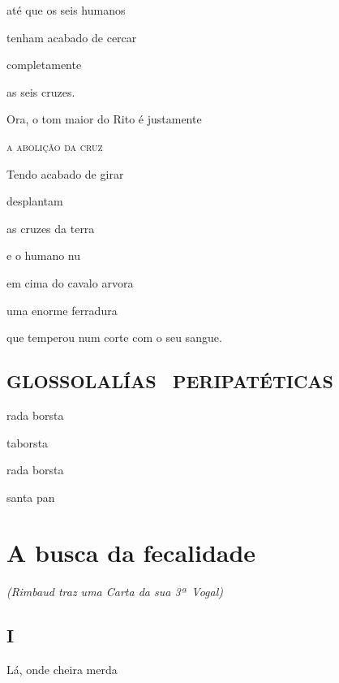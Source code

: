 até que os seis humanos

tenham acabado de cercar

completamente

as seis cruzes.


Ora, o tom maior do Rito é justamente

\textsc{a abolição da cruz}

Tendo acabado de girar

desplantam

as cruzes da terra

e o humano nu

em cima do cavalo arvora

uma enorme ferradura

que temperou num corte com o seu sangue.


\vspace*{\fill}
\section*{GLOSSOLALÍAS~ PERIPATÉTICAS}

\begin{center}
rada borsta

taborsta

rada borsta

santa pan
\end{center}
\vspace*{\fill}

\chapter{A busca da fecalidade}

\emph{(Rimbaud traz uma Carta da sua 3ª~Vogal)}

\section*{I}



Lá, onde cheira merda

